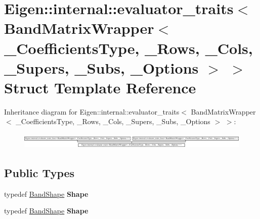 \hypertarget{struct_eigen_1_1internal_1_1evaluator__traits_3_01_band_matrix_wrapper_3_01___coefficients_type_cee9d317520cda5230220118c896281a}{}\section{Eigen\+:\+:internal\+:\+:evaluator\+\_\+traits$<$ Band\+Matrix\+Wrapper$<$ \+\_\+\+Coefficients\+Type, \+\_\+\+Rows, \+\_\+\+Cols, \+\_\+\+Supers, \+\_\+\+Subs, \+\_\+\+Options $>$ $>$ Struct Template Reference}
\label{struct_eigen_1_1internal_1_1evaluator__traits_3_01_band_matrix_wrapper_3_01___coefficients_type_cee9d317520cda5230220118c896281a}
Inheritance diagram for Eigen\+:\+:internal\+:\+:evaluator\+\_\+traits$<$ Band\+Matrix\+Wrapper$<$ \+\_\+\+Coefficients\+Type, \+\_\+\+Rows, \+\_\+\+Cols, \+\_\+\+Supers, \+\_\+\+Subs, \+\_\+\+Options $>$ $>$\+:\begin{figure}[H]
\begin{center}
\leavevmode
\includegraphics[height=0.760870cm]{struct_eigen_1_1internal_1_1evaluator__traits_3_01_band_matrix_wrapper_3_01___coefficients_type_cee9d317520cda5230220118c896281a}
\end{center}
\end{figure}
\subsection*{Public Types}
\begin{DoxyCompactItemize}
\item 
\mbox{\label{struct_eigen_1_1internal_1_1evaluator__traits_3_01_band_matrix_wrapper_3_01___coefficients_type_cee9d317520cda5230220118c896281a_a4c8104880ecefd0e1b820cfe7d980af3}} 
typedef \hyperlink{struct_eigen_1_1internal_1_1_band_shape}{Band\+Shape} {\bfseries Shape}
\item 
\mbox{\label{struct_eigen_1_1internal_1_1evaluator__traits_3_01_band_matrix_wrapper_3_01___coefficients_type_cee9d317520cda5230220118c896281a_a4c8104880ecefd0e1b820cfe7d980af3}} 
typedef \hyperlink{struct_eigen_1_1internal_1_1_band_shape}{Band\+Shape} {\bfseries Shape}
\end{DoxyCompactItemize}



